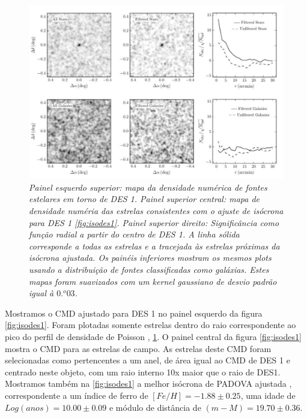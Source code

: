 \documentclass[
	12pt,				%
	openany,			%
	oneside,			%
	a4paper,			%
	english,			%
	brazil				%
	]{abntex2}
\begin{document}
\begin{figure}[h]
\begin{center}
\includegraphics[width=12cm]{figuras/mapdes1.pdf}
\caption{\textit{Painel esquerdo superior: mapa da densidade numérica de fontes estelares em torno de DES 1. Painel superior central: mapa de densidade numéria das estrelas consistentes com o ajuste de isócrona para DES 1 \ref{fig:isodes1}. Painel superior direito: Significância como função radial a partir do centro de DES 1. A linha sólida corresponde a todas as estrelas e a tracejada às estrelas próximas da isócrona ajustada. Os painéis inferiores mostram os mesmos plots usando a distribuição de fontes classificadas como galáxias. Estes mapas foram suavizados com um kernel gaussiano de desvio padrão igual à $0.^{o}03$.}}
\label{fig:mapdes1}
\end{center}
\end{figure}
\vspace{0.5cm}
Mostramos o CMD ajustado para DES 1 no painel esquerdo da figura \ref{fig:isodes1}. Foram plotadas somente estrelas dentro do raio correspondente ao pico do perfil de densidade de Poisson , \ref{fig:mapdes1}. O painel central da figura \ref{fig:isodes1} mostra o CMD para as estrelas de campo. As estrelas deste CMD foram selecionadas como pertencentes a  um anel,  de área igual ao CMD de DES 1 e centrado neste objeto, com um raio interno 10x maior que o raio de DES1. Mostramos também na \ref{fig:isodes1} a melhor isócrona de PADOVA ajustada \cite{2012MNRAS.427..127B}, correspondente a um índice de ferro de $[Fe/H] = −1.88 \pm 0.25$, uma idade de $Log(anos) = 10.00 \pm 0.09$ e módulo de distância de $(m-M) = 19.70 \pm 0.36$. 
\end{document}
